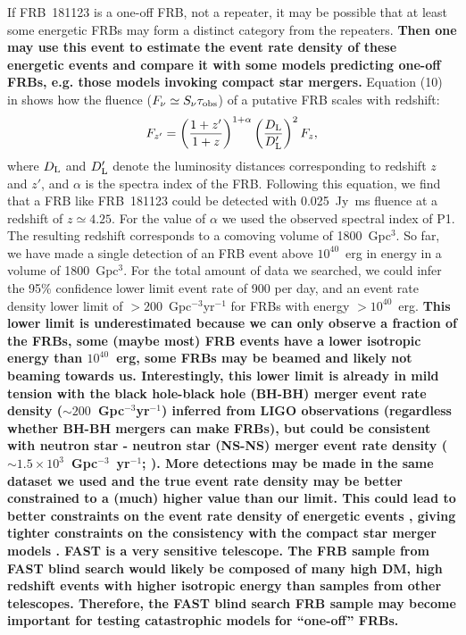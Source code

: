 If FRB~181123 is a one-off FRB, not a repeater, it may be possible that at least some energetic FRBs may form a distinct category from the repeaters. 
{\bf Then one may use this event to estimate the event rate density of these energetic events and compare it with some models predicting one-off FRBs, e.g. those models invoking compact star mergers. }
Equation (10) in \citet{zhang18} shows how the fluence ($F_{\nu}\simeq  S_{\nu}\tau_{\rm obs}$) of a putative FRB scales with redshift: \begin{equation}
    F_{z'} = \left(\frac{1+z'}{1+z}\right)^{1+\alpha}\left(\frac{D_{\rm L}}{D_{\rm L}'}\right)^2F_{z},
\end{equation} 
where $D_{\rm L}$ and $D_{\rm L}'$ denote the luminosity distances corresponding to redshift $z$ and $z'$, and $\alpha$ is the spectra index of the FRB.
Following this equation, we find that a FRB like FRB~181123 could be detected with
0.025~Jy~ms fluence at a redshift of $z\simeq4.25$. 
For the value of $\alpha$ we used the observed spectral index of P1.
The resulting redshift corresponds to a comoving volume of 1800~Gpc$^3$. 
So far, we have made a single detection of an FRB event above $10^{40}$~erg in energy in a volume of 1800~Gpc$^3$. 
For the total amount of data we searched, we could infer the 95\% confidence lower limit event rate of 900 per day, and an event rate density lower limit of $>200$~Gpc$^{-3}$yr$^{-1}$ for FRBs with energy $>10^{40}$~erg. 
{\bf This lower limit is underestimated because we can only observe a fraction of the FRBs, some (maybe most) FRB events have a lower isotropic energy than $10^{40}$~erg, some FRBs may be beamed and likely not beaming towards us. 
Interestingly, this lower limit is already in mild tension with the black hole-black hole (BH-BH) merger event rate density ($\sim 200$~Gpc$^{-3}$yr$^{-1}$) inferred from LIGO observations \citep{mg18} (regardless whether BH-BH mergers can make FRBs), but could be consistent with neutron star - neutron star (NS-NS) merger event rate density ($\sim 1.5\times10^3$~Gpc$^{-3}$~yr$^{-1}$; \citealt{aaa+17}). More detections may be made in the same dataset we used and the true event rate density may be better constrained to a (much) higher value than our limit. This could lead to better constraints on the event rate density of energetic events \citep{lml+20}, giving tighter constraints on the consistency with the compact star merger models \citep[see also][]{wang20}. 
FAST is a very sensitive telescope. The FRB sample from FAST blind search would likely be composed of many high DM, high redshift events with higher isotropic energy than samples from other telescopes. Therefore, the FAST blind search FRB sample may become important for testing catastrophic models for ``one-off'' FRBs.
}


